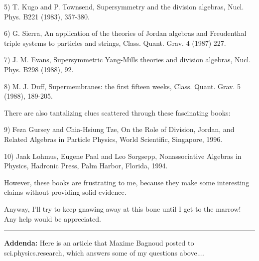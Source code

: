 5) T. Kugo and P. Townsend, Supersymmetry and the division algebras, 
Nucl. Phys. B221 (1983), 357-380. 
 
6) G. Sierra, An application of the theories of Jordan algebras and 
Freudenthal triple systems to particles and strings, Class. Quant.  
Grav. 4 (1987) 227. 
 
7) J. M. Evans, Supersymmetric Yang-Mills theories and division algebras, 
Nucl. Phys. B298 (1988), 92. 
 
8) M. J. Duff, Supermembranes: the first fifteen weeks, Class. Quant. 
Grav. 5 (1988), 189-205. 
 
There are also tantalizing clues scattered through these fascinating 
books: 
 
9) Feza Gursey and Chia-Hsiung Tze, On the Role of Division, Jordan, and 
Related Algebras in Particle Physics, World Scientific, Singapore, 1996. 
 
10) Jaak Lohmus, Eugene Paal and Leo Sorgsepp, Nonassociative Algebras 
in Physics, Hadronic Press, Palm Harbor, Florida, 1994. 
 
However, these books are frustrating to me, because they make some 
interesting claims without providing solid evidence.   
 
Anyway, I'll try to keep gnawing away at this bone until I get to the 
marrow!   Any help would be appreciated.
 

\par\noindent\rule{\textwidth}{0.4pt}
\textbf{Addenda:}
Here is an article that Maxime Bagnoud posted to sci.physics.research,
which answers some of my questions above....




